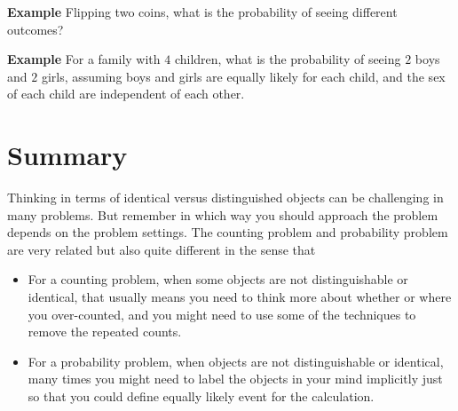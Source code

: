 \documentclass[12pt]{article}
\begin{document}
\textbf{Example} Flipping two coins, what is the probability of seeing different outcomes?

\textbf{Example} For a family with $4$ children, what is the probability of seeing $2$ boys and $2$ girls, assuming boys and girls are equally likely for each child, and the sex of each child are independent of each other. 


\section{Summary}
Thinking in terms of identical versus distinguished objects can be challenging in many problems. But remember in which way you should approach the problem depends on the problem settings. The counting problem and probability problem are very related but also quite different in the sense that
	\begin{itemize}
		\item For a counting problem, when some objects are not distinguishable or identical, that usually means you need to think more about whether or where you over-counted, and you might need to use some of the techniques to remove the repeated counts.
		\item For a probability problem, when objects are not distinguishable or identical, many times you might need to label the objects in your mind implicitly just so that you could define equally likely event for the calculation.  
	\end{itemize}
\end{document}
